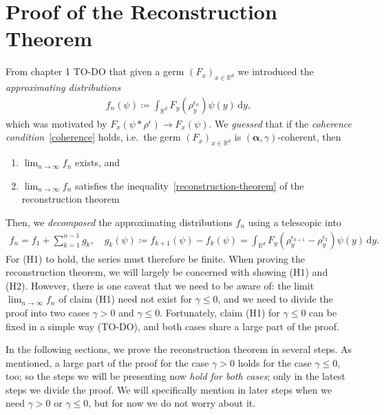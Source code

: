 
\chapter{Proof of the Reconstruction Theorem}\label{chapter:general-proof}

From chapter 1 TO-DO that given a germ \((F_x)_{x \in \mathbb{R}^d}\) we introduced the \emph{approximating distributions} 
\begin{align*}
    f_n(\psi) \coloneqq \int_{\mathbb{R}^d} F_y(\rho_y^{\epsilon_n}) \psi(y) \, \mathrm{d}y \tag{Approximating distributions},
\end{align*}
which was motivated by \(F_x(\psi * \rho^\epsilon) \to F_x(\psi)\). We \emph{guessed} that if the \emph{coherence condition}~\eqref{coherence} holds, i.e.\ the germ \((F_x)_{x \in \mathbb{R}^d}\) is \((\bm \alpha, \gamma)\)-coherent, then
\begin{enumerate}[label=(H\arabic*)] %
    \item \(\lim_{n \to \infty}f_n\) exists, and
    \item  \(\lim_{n \to \infty}f_n\) satisfies the inequality~\eqref{reconstruction-theorem} of the reconstruction theorem
 \end{enumerate}
 Then, we \emph{decomposed} the approximating distributions \(f_n\) using a telescopic into 
 \begin{align*}
    f_n = f_1 + \sum^{n-1}_{k=1}
    g_k, \quad g_k(\psi) \coloneqq f_{k+1}(\psi) - f_k(\psi) = \int_{\mathbb{R}^d} F_y(\rho_y^{\epsilon_{k+1}} - \rho_y^{\epsilon_k}) \psi(y)\, \mathrm{d}y.
 \end{align*}
For (H1) to hold, the series must therefore be finite. When proving the reconstruction theorem, we will largely be concerned with showing (H1) and (H2). However, there is one caveat that we need to be aware of: the limit \(\lim_{n \to \infty}f_n\) of claim (H1) need not exist for \(\gamma \leq 0\), and we need to divide the proof into two cases \(\gamma >0\) and \(\gamma \leq 0\). Fortunately, claim (H1) for \(\gamma \leq 0\) can be fixed in a simple way (TO-DO), and both cases share a large part of the proof. 

In the following sections, we prove the reconstruction theorem in several steps. As mentioned, a large part of the proof for the case \(\gamma > 0\) holds for the case \(\gamma \leq 0\), too; so the steps we will be presenting now \emph{hold for both cases}; only in the latest steps we divide the proof. We will specifically mention in later steps when we need \(\gamma > 0\) or \(\gamma\leq 0\), but for now we do not worry about it.

